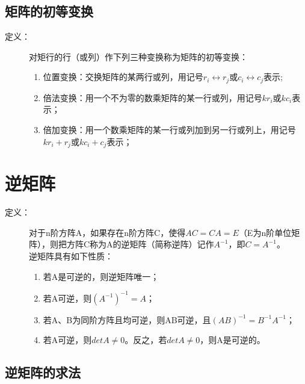 \documentclass[a4paper,10pt]{article}
\begin{document}
\begin{CJK}{UTF8}{song}
\subsection{矩阵的初等变换}
\begin{description}
\item[定义：]对矩行的行（或列）作下列三种变换称为矩阵的初等变换：
\begin{enumerate}
\item 位置变换：交换矩阵的某两行或列，用记号$r_{i}\leftrightarrow{}r_{j}$或$c_{i}\leftrightarrow{}c_{j}$表示;
\item 倍法变换：用一个不为零的数乘矩阵的某一行或列，用记号$kr_{i}$或$kc_{i}$表示；
\item 倍加变换：用一个数乘矩阵的某一行或列加到另一行或列上，用记号$kr_{i}+r_{j}$或$kc_{i}+c_{j}$表示；
\end{enumerate}

\end{description}

\section{逆矩阵}
\begin{description}
 \item[定义：]对于n阶方阵A，如果存在n阶方阵C，使得$AC=CA=E$（E为n阶单位矩阵），则把方阵C称为A的逆矩阵（简称逆阵）记作$A^{-1}$，即$C=A^{-1}$。\\
逆矩阵具有如下性质：
\begin{enumerate}
\item 若A是可逆的，则逆矩阵唯一；
\item 若A可逆，则$(A^{-1})^{-1}=A$；
\item 若A、B为同阶方阵且均可逆，则AB可逆，且$(AB)^{-1}=B^{-1}A^{-1}$；
\item 若A可逆，则$detA\neq{}0$。反之，若$detA\neq{}0$，则A是可逆的。
\end{enumerate}
\end{description}
\subsection{逆矩阵的求法}

\end{CJK}
\end{document}

